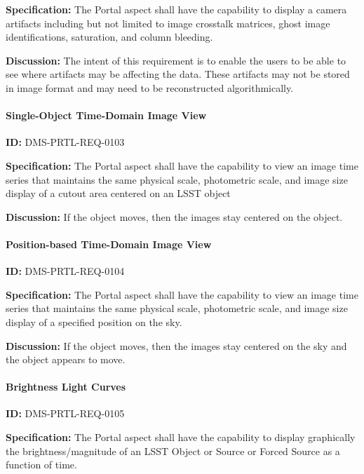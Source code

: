 \documentclass[SE,toc]{lsstdoc}
\begin{document}
\textbf{Specification:}
The Portal aspect shall have the capability to display a camera artifacts including but not limited to image crosstalk matrices, ghost image identifications, saturation, and column bleeding.

\textbf{Discussion:}
The intent of this requirement is to enable the users to be able to see where artifacts may be affecting the data. These artifacts may not be stored in image format and may need to be reconstructed algorithmically.

\paragraph{Single-Object Time-Domain Image View}\hfill  %

\label{DMS-PRTL-REQ-0103}
\textbf{ID:} DMS-PRTL-REQ-0103

\textbf{Specification:}
The Portal aspect shall have the capability to view an image time series that maintains the same physical scale, photometric scale, and image size display of a cutout area centered on an LSST object

\textbf{Discussion:}
If the object moves, then the images stay centered on the object.

\paragraph{Position-based Time-Domain Image View}\hfill  %

\label{DMS-PRTL-REQ-0104}
\textbf{ID:} DMS-PRTL-REQ-0104

\textbf{Specification:}
The Portal aspect shall have the capability to view an image time series that maintains the same physical scale, photometric scale, and image size display of a specified position on the sky.

\textbf{Discussion:}
If the object moves, then the images stay centered on the sky and the object appears to move.

\paragraph{Brightness Light Curves}\hfill  %

\label{DMS-PRTL-REQ-0105}
\textbf{ID:} DMS-PRTL-REQ-0105

\textbf{Specification:}
The Portal aspect shall have the capability to display graphically the brightness/magnitude of an LSST Object or Source or Forced Source as a function of time.
\end{document}
